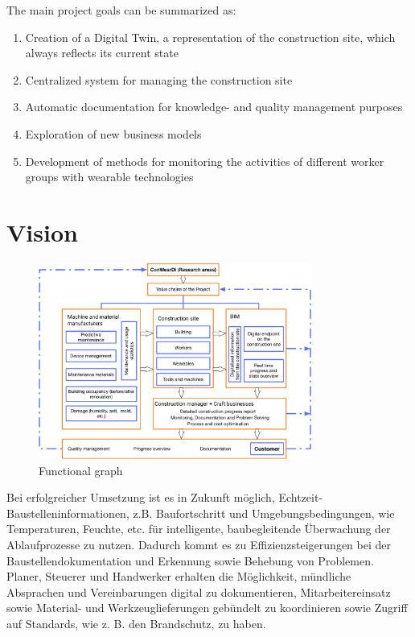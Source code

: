 
The main project goals can be summarized as:
\begin{enumerate}
  \item Creation of a Digital Twin, a representation of the construction site, which always reflects its current state 
  \item Centralized system for managing the construction site
  \item Automatic documentation for knowledge- and quality management purposes
  \item Exploration of new business models
  \item Development of methods for monitoring the activities of different worker groups with wearable technologies
\end{enumerate}

\section{Vision}

\begin{figure}[htp]
\includegraphics[width=0.8\textwidth]{figures/conweardi-functional}
\caption{Functional graph}
\label{fig:functional}
\end{figure}



Bei erfolgreicher Umsetzung ist es in Zukunft möglich, Echtzeit-Baustelleninformationen, z.B. Baufortschritt und Umgebungsbedingungen, wie Temperaturen, Feuchte, etc. für intelligente, baubegleitende Überwachung der Ablaufprozesse zu nutzen. Dadurch kommt es zu Effizienzsteigerungen bei der Baustellendokumentation und Erkennung sowie Behebung von Problemen. Planer, Steuerer und Handwerker erhalten die Möglichkeit, mündliche Absprachen und Vereinbarungen digital zu dokumentieren, Mitarbeitereinsatz sowie Material- und Werkzeuglieferungen gebündelt zu koordinieren sowie Zugriff auf Standards, wie z. B. den Brandschutz, zu haben.

